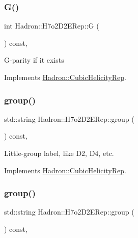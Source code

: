 \subsubsection{\texorpdfstring{G()}{G()}\hspace{0.1cm}{\footnotesize\ttfamily [3/3]}}
{\footnotesize\ttfamily int Hadron\+::\+H7o2\+D2\+E\+Rep\+::G (\begin{DoxyParamCaption}{ }\end{DoxyParamCaption}) const\hspace{0.3cm}{\ttfamily [inline]}, {\ttfamily [virtual]}}

G-\/parity if it exists 

Implements \mbox{\hyperlink{structHadron_1_1CubicHelicityRep_a50689f42be1e6170aa8cf6ad0597018b}{Hadron\+::\+Cubic\+Helicity\+Rep}}.

\mbox{\label{structHadron_1_1H7o2D2ERep_a01d61c7d2d2ee0a909d40c5d43a90e09}} 
\subsubsection{\texorpdfstring{group()}{group()}\hspace{0.1cm}{\footnotesize\ttfamily [1/5]}}
{\footnotesize\ttfamily std\+::string Hadron\+::\+H7o2\+D2\+E\+Rep\+::group (\begin{DoxyParamCaption}{ }\end{DoxyParamCaption}) const\hspace{0.3cm}{\ttfamily [inline]}, {\ttfamily [virtual]}}

Little-\/group label, like D2, D4, etc. 

Implements \mbox{\hyperlink{structHadron_1_1CubicHelicityRep_a101a7d76cd8ccdad0f272db44b766113}{Hadron\+::\+Cubic\+Helicity\+Rep}}.

\mbox{\label{structHadron_1_1H7o2D2ERep_a01d61c7d2d2ee0a909d40c5d43a90e09}} 
\subsubsection{\texorpdfstring{group()}{group()}\hspace{0.1cm}{\footnotesize\ttfamily [2/5]}}
{\footnotesize\ttfamily std\+::string Hadron\+::\+H7o2\+D2\+E\+Rep\+::group (\begin{DoxyParamCaption}{ }\end{DoxyParamCaption}) const\hspace{0.3cm}{\ttfamily [inline]}, {\ttfamily [virtual]}}

